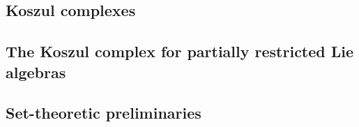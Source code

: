 \documentclass[11pt]{article}
\begin{document}
\subsection*{Koszul complexes}
\begin{itemise}
\setlength{\parindent}{.25in}
\item 
\end{itemise}







\begin{PRlieKoszulComplexCalculation}
\section*{The Koszul complex for partially restricted Lie algebras}
\subsection*{Set-theoretic preliminaries}


\end{PRlieKoszulComplexCalculation}
\end{document}
